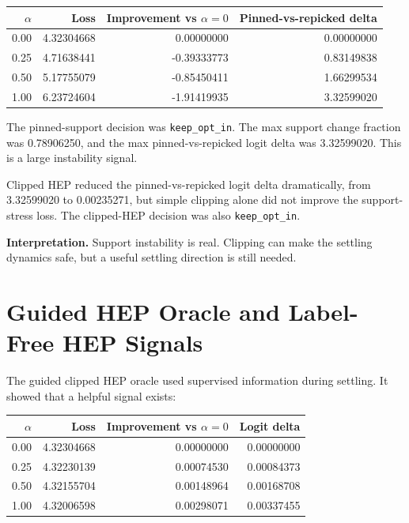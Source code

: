 \documentclass[11pt]{article}
\begin{document}
\begin{center}
\begin{tabular}{r r r r}
\hline
$\alpha$ & Loss & Improvement vs $\alpha=0$ & Pinned-vs-repicked delta \\
\hline
0.00 & 4.32304668 & 0.00000000 & 0.00000000 \\
0.25 & 4.71638441 & -0.39333773 & 0.83149838 \\
0.50 & 5.17755079 & -0.85450411 & 1.66299534 \\
1.00 & 6.23724604 & -1.91419935 & 3.32599020 \\
\hline
\end{tabular}
\end{center}

The pinned-support decision was \texttt{keep\_opt\_in}. The max support change
fraction was 0.78906250, and the max pinned-vs-repicked logit delta was
3.32599020. This is a large instability signal.

Clipped HEP reduced the pinned-vs-repicked logit delta dramatically, from
3.32599020 to 0.00235271, but simple clipping alone did not improve the
support-stress loss. The clipped-HEP decision was also \texttt{keep\_opt\_in}.

\textbf{Interpretation.} Support instability is real. Clipping can make the
settling dynamics safe, but a useful settling direction is still needed.

\section{Guided HEP Oracle and Label-Free HEP Signals}

The guided clipped HEP oracle used supervised information during settling. It
showed that a helpful signal exists:

\begin{center}
\begin{tabular}{r r r r}
\hline
$\alpha$ & Loss & Improvement vs $\alpha=0$ & Logit delta \\
\hline
0.00 & 4.32304668 & 0.00000000 & 0.00000000 \\
0.25 & 4.32230139 & 0.00074530 & 0.00084373 \\
0.50 & 4.32155704 & 0.00148964 & 0.00168708 \\
1.00 & 4.32006598 & 0.00298071 & 0.00337455 \\
\hline
\end{tabular}
\end{center}
\end{document}

